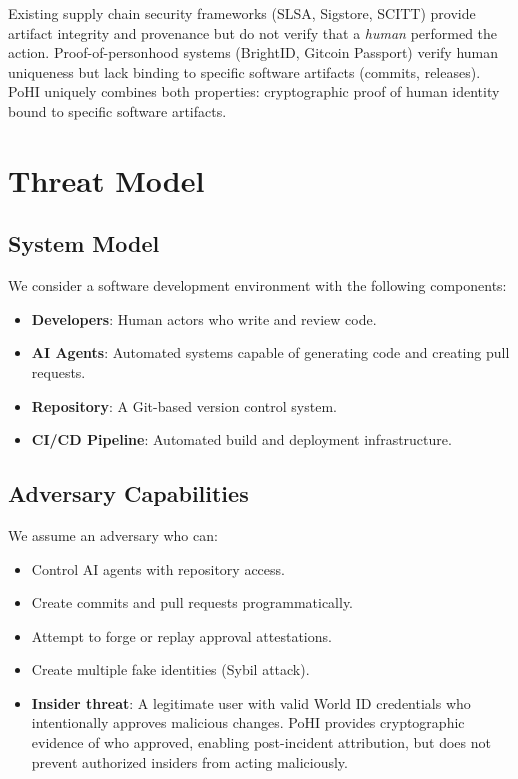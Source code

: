\documentclass[conference]{IEEEtran}
\begin{document}
Existing supply chain security frameworks (SLSA, Sigstore, SCITT) provide artifact integrity and provenance but do not verify that a \textit{human} performed the action. Proof-of-personhood systems (BrightID, Gitcoin Passport) verify human uniqueness but lack binding to specific software artifacts (commits, releases). PoHI uniquely combines both properties: cryptographic proof of human identity bound to specific software artifacts.

\section{Threat Model}

\subsection{System Model}

We consider a software development environment with the following components:
\begin{itemize}
    \item \textbf{Developers}: Human actors who write and review code.
    \item \textbf{AI Agents}: Automated systems capable of generating code and creating pull requests.
    \item \textbf{Repository}: A Git-based version control system.
    \item \textbf{CI/CD Pipeline}: Automated build and deployment infrastructure.
\end{itemize}

\subsection{Adversary Capabilities}

We assume an adversary who can:
\begin{itemize}
    \item Control AI agents with repository access.
    \item Create commits and pull requests programmatically.
    \item Attempt to forge or replay approval attestations.
    \item Create multiple fake identities (Sybil attack).
    \item \textbf{Insider threat}: A legitimate user with valid World ID credentials who intentionally approves malicious changes. PoHI provides cryptographic evidence of who approved, enabling post-incident attribution, but does not prevent authorized insiders from acting maliciously.
\end{itemize}
\end{document}
